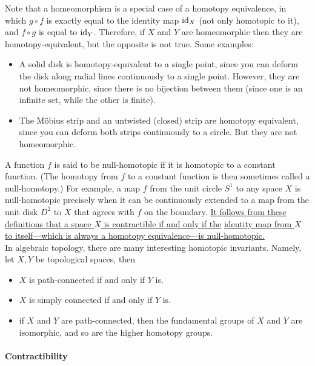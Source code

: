 \documentclass{homework}
\begin{document}
Note that a homeomorphism is a special case of a homotopy equivalence, in which $g \circ f$ is exactly equal to the identity map $\textnormal{id}_X$ (not only homotopic to it), and $f \circ g$ is equal to $\textnormal{id}_Y$. Therefore, if $X$ and $Y$ are homeomorphic then they are homotopy-equivalent, but the opposite is not true. Some examples:

\begin{itemize}
    \item A solid disk is homotopy-equivalent to a single point, since you can deform the disk along radial lines continuously to a single point. However, they are not homeomorphic, since there is no bijection between them (since one is an infinite set, while the other is finite).
    \item The Möbius strip and an untwisted (closed) strip are homotopy equivalent, since you can deform both strips continuously to a circle. But they are not homeomorphic. \\
\end{itemize}

A function $f$ is said to be null-homotopic if it is homotopic to a constant function. (The homotopy from $f$ to a constant function is then sometimes called a null-homotopy.) For example, a map $f$ from the unit circle $S^1$ to any space $X$ is null-homotopic precisely when it can be continuously extended to a map from the unit disk $D^2$ to $X$ that agrees with $f$ on the boundary. \underline{It follows from these definitions that a space $X$ is contractible if and only if the}
\underline{ identity map from $X$ to itself—which is always a homotopy equivalence—is null-homotopic.} \\

In algebraic topology, there are many interesting homotopic invariants. Namely, let $X, Y$ be topological spaces, then 

\begin{itemize}
    \item $X$ is path-connected if and only if $Y$ is.
    \item $X$ is simply connected if and only if $Y$ is.
    \item if $X$ and $Y$ are path-connected, then the fundamental groups of $X$ and $Y$ are isomorphic, and so are the higher homotopy groups. \\
\end{itemize}

\paragraph{\textbf{Contractibility}}
\end{document}
